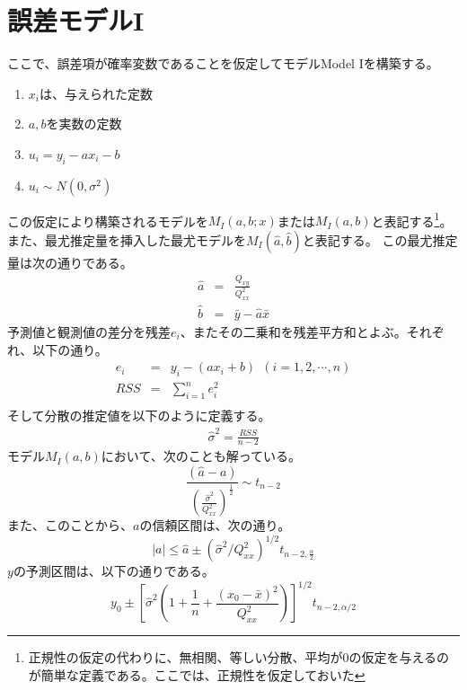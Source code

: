 \section{誤差モデルI}
ここで、誤差項が確率変数であることを仮定してモデルModel Iを構築する。
\begin{enumerate}
 \item $x_i$は、与えられた定数
 \item $a,b$を実数の定数
 \item $u_i = y_i-a x_i -b$
 \item $u_i \sim N(0,\sigma^2)$
\end{enumerate}
この仮定により構築されるモデルを$M_{I}(a,b; x)$または$M_I(a,b)$と表記する\footnote{正規性の仮定の代わりに、無相関、等しい分散、平均が$0$の仮定を与えるのが簡単な定義である。ここでは、正規性を仮定しておいた}。
また、最尤推定量を挿入した最尤モデルを$M_I(\hat{a},\hat{b})$と表記する。
この最尤推定量は次の通りである。
\begin{eqnarray*}
 \hat{a} &=& \frac{Q_{xy}}{Q^2_{xx}}\\
 \hat{b} &=& \bar{y}-\hat{a}\bar{x}
\end{eqnarray*}
予測値と観測値の差分を残差$e_i$、またその二乗和を残差平方和とよぶ。それぞれ、以下の通り。
\begin{eqnarray*}
 e_i &=& y_i - (ax_i+b)\ \ (i=1,2,\cdots,n)\\
 RSS &=& \sum_{i=1}^n e_i^2 \\
\end{eqnarray*}
そして分散の推定値を以下のように定義する。
\begin{eqnarray*}
 \hat{\sigma}^2 = \frac{RSS}{n-2}
\end{eqnarray*}
モデル$M_I(a,b)$において、次のことも解っている。
\begin{equation*}
 \frac{(\hat{a}-a)}{ \left( \frac{\hat{\sigma}^2}{Q^2_{xx}} \right)^\frac{1}{2}} \sim t_{n-2}
\end{equation*}
また、このことから、$a$の信頼区間は、次の通り。
\begin{equation*}
 |a| \leq \hat{a}\pm(\hat{\sigma}^2/Q^2_{xx})^{1/2}t_{n-2,\frac{\alpha}{2}}
\end{equation*}
$y$の予測区間は、以下の通りである。
\begin{equation*}
 y_0\pm\left[\hat{\sigma}^2\left( 1+\frac{1}{n} +\frac{(x_0-\bar{x})^2}{Q^2_{xx}} \right)\right]^{1/2}t_{n-2,\alpha/2}
\end{equation*}

